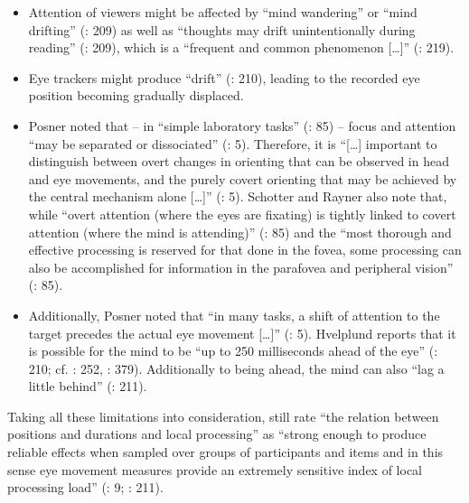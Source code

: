 \sloppy
\begin{itemize}
\item Attention of viewers might be affected by “mind wandering” or “mind drifting” (\citealt{Hvelplund2014}: 209) as well as “thoughts may drift unintentionally during reading” (\citeyear{Hvelplund2014}: 209), which is a “frequent and common phenomenon […]” (\citealt{Hvelplund2014}: 219).
\item Eye trackers might produce “drift” (\citealt{Hvelplund2014}: 210), leading to the recorded eye position becoming gradually displaced.
\item Posner noted that – in “simple laboratory tasks” (\citealt{schotter2012}: 85) – focus and attention “may be separated or dissociated” (\citeyear{Posner1980}: 5). Therefore, it is “[…] important to distinguish between overt changes in orienting that can be observed in head and eye movements, and the purely covert orienting that may be achieved by the central mechanism alone […]” (\citeyear{Posner1980}: 5). Schotter and Rayner also note that, while “overt attention (where the eyes are fixating) is tightly linked to covert attention (where the mind is attending)” (\citealt{schotter2012}: 85) and the “most thorough and effective processing is reserved for that done in the fovea, some processing can also be accomplished for information in the parafovea and peripheral vision” (\citeyear{schotter2012}: 85).
\item Additionally, Posner noted that “in many tasks, a shift of attention to the  target precedes the actual eye movement […]” (\citeyear{Posner1980}: 5). Hvelplund reports that it is possible for the mind to be “up to 250 milliseconds ahead of the eye” (\citeyear{Hvelplund2014}: 210; cf. \citealt{obrien2009}: 252, \citealt{Holmqvist2011}: 379). Additionally to being ahead, the mind can also “lag a little behind” (\citealt{Hvelplund2014}: 211).
\end{itemize}
\fussy 

Taking all these limitations into consideration, \citet[9]{radach-kennedy2004} still rate “the relation between  positions and durations and local processing”  as “strong enough to produce reliable effects when sampled over groups of participants and items and in this sense eye movement measures provide an extremely sensitive index of local processing load” (\citeyear{radach-kennedy2004}: 9; \citealt{Hvelplund2014}: 211).


